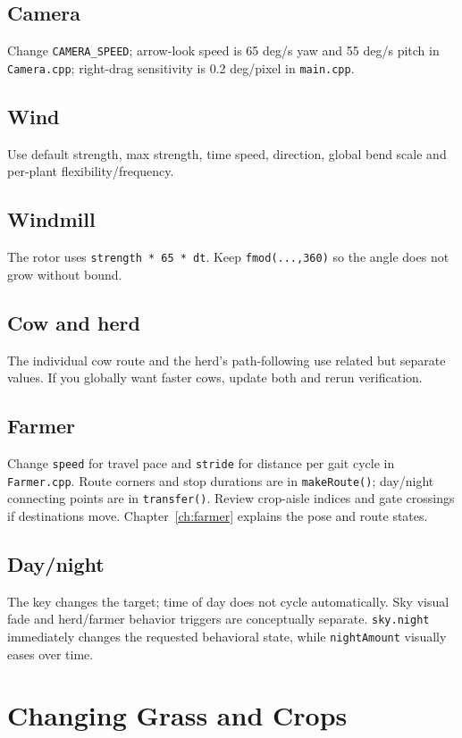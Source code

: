 \documentclass[11pt,a4paper,openany]{book}
\newcommand{\code}[1]{\texttt{#1}}
\newcommand{\file}[1]{\nolinkurl{#1}}
\newcommand{\keycap}[1]{\begingroup\setlength{\fboxsep}{0.8pt}\raisebox{0.05ex}{\fbox{\footnotesize\texttt{#1}}}\endgroup}
\begin{document}
\section{Camera}
Change \code{CAMERA_SPEED}; arrow-look speed is 65 deg/s yaw and 55 deg/s pitch in \file{Camera.cpp}; right-drag sensitivity is 0.2 deg/pixel in \file{main.cpp}.

\section{Wind}
Use default strength, max strength, time speed, direction, global bend scale and per-plant flexibility/frequency.

\section{Windmill}
The rotor uses \code{strength * 65 * dt}. Keep \code{fmod(...,360)} so the angle does not grow without bound.

\section{Cow and herd}
The individual cow route and the herd's path-following use related but separate values. If you globally want faster cows, update both and rerun verification.

\section{Farmer}
Change \code{speed} for travel pace and \code{stride} for distance per gait cycle in \file{Farmer.cpp}. Route corners and stop durations are in \code{makeRoute()}; day/night connecting points are in \code{transfer()}. Review crop-aisle indices and gate crossings if destinations move. Chapter~\ref{ch:farmer} explains the pose and route states.

\section{Day/night}
The \keycap{N} key changes the target; time of day does not cycle automatically. Sky visual fade and herd/farmer behavior triggers are conceptually separate. \code{sky.night} immediately changes the requested behavioral state, while \code{nightAmount} visually eases over time.

\chapter{Changing Grass and Crops}
\end{document}
